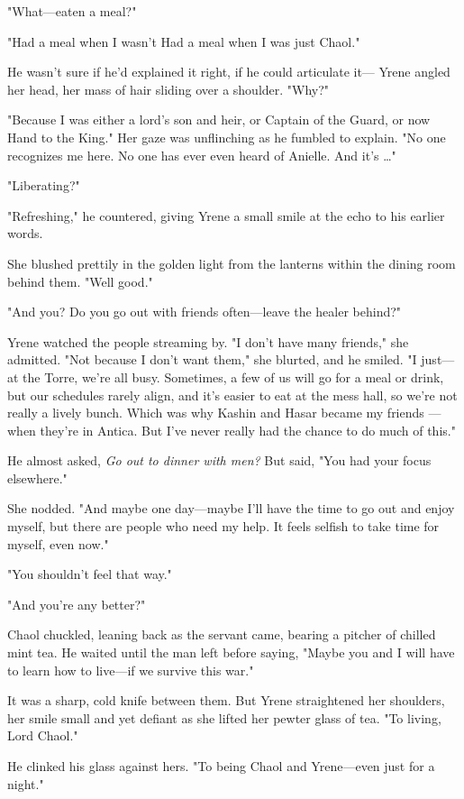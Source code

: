 "What---eaten a meal?"

"Had a meal when I wasn't  Had a meal when I was just 
Chaol."

He wasn't sure if he'd explained it right, if he could articulate it--- Yrene angled her head, her mass of hair sliding over a shoulder. "Why?"

"Because I was either a lord's son and heir, or Captain of the Guard, or now Hand to the King." Her gaze was unflinching as he fumbled to explain. "No one recognizes me here. No one has ever even heard of Anielle. And it's \ldots"

"Liberating?"

"Refreshing," he countered, giving Yrene a small smile at the echo to his earlier words.

She blushed prettily in the golden light from the lanterns within the dining room behind them. "Well  good."

"And you? Do you go out with friends often---leave the healer behind?"

Yrene watched the people streaming by. "I don't have many friends," she admitted. "Not because I don't want them," she blurted, and he smiled. "I just--- at the Torre, we're all busy. Sometimes, a few of us will go for a meal or drink, but our schedules rarely align, and it's easier to eat at the mess hall, so  we're not really a lively bunch. Which was why Kashin and Hasar became my friends ---when they're in Antica. But I've never really had the chance to do much of this."

He almost asked, \emph{Go out to dinner with men?} But said, "You had your focus elsewhere."

She nodded. "And maybe one day---maybe I'll have the time to go out and enjoy myself, but  there are people who need my help. It feels selfish to take time for myself, even now."

"You shouldn't feel that way."

"And you're any better?"

Chaol chuckled, leaning back as the servant came, bearing a pitcher of chilled mint tea. He waited until the man left before saying, "Maybe you and I will have to learn how to live---if we survive this war."

It was a sharp, cold knife between them. But Yrene straightened her shoulders, her smile small and yet defiant as she lifted her pewter glass of tea. "To living, Lord Chaol."

He clinked his glass against hers. "To being Chaol and Yrene---even just for a night."

